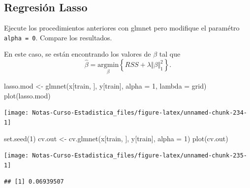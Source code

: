 \documentclass[
  12pt,
]{book}
\newenvironment{Shaded}{\begin{snugshade}}{\end{snugshade}}
\newcommand{\AttributeTok}[1]{\textcolor[rgb]{0.77,0.63,0.00}{#1}}
\newcommand{\DecValTok}[1]{\textcolor[rgb]{0.00,0.00,0.81}{#1}}
\newcommand{\FunctionTok}[1]{\textcolor[rgb]{0.00,0.00,0.00}{#1}}
\newcommand{\NormalTok}[1]{#1}
\newcommand{\OtherTok}[1]{\textcolor[rgb]{0.56,0.35,0.01}{#1}}
\newcommand{\SpecialCharTok}[1]{\textcolor[rgb]{0.00,0.00,0.00}{#1}}
\theoremstyle{definition}
\theoremstyle{definition}
\theoremstyle{definition}
\theoremstyle{definition}
\theoremstyle{remark}
\begin{document}
\hypertarget{regresiuxf3n-lasso-1}{%
\subsection{Regresión Lasso}\label{regresiuxf3n-lasso-1}}

Ejecute los procedimientos anteriores con glmnet pero modifique el paramétro \texttt{alpha\ =\ 0}. Compare los resultados.

En este caso, se están encontrando los valores de \(\beta\) tal que
\[\hat{\beta} = \underset{\beta}{\mathrm{argmin}} \left\{RSS + \lambda \Vert \beta \Vert_1^2\right\}.\]

\begin{Shaded}
\begin{Highlighting}[]
\NormalTok{lasso.mod }\OtherTok{\textless{}{-}} \FunctionTok{glmnet}\NormalTok{(x[train, ], y[train], }\AttributeTok{alpha =} \DecValTok{1}\NormalTok{,}
    \AttributeTok{lambda =}\NormalTok{ grid)}
\FunctionTok{plot}\NormalTok{(lasso.mod)}
\end{Highlighting}
\end{Shaded}

\begin{center}\texttt{[image: Notas-Curso-Estadistica\_files/figure-latex/unnamed-chunk-234-1]} \end{center}

\begin{Shaded}
\begin{Highlighting}[]
\FunctionTok{set.seed}\NormalTok{(}\DecValTok{1}\NormalTok{)}
\NormalTok{cv.out }\OtherTok{\textless{}{-}} \FunctionTok{cv.glmnet}\NormalTok{(x[train, ], y[train], }\AttributeTok{alpha =} \DecValTok{1}\NormalTok{)}
\FunctionTok{plot}\NormalTok{(cv.out)}
\end{Highlighting}
\end{Shaded}

\begin{center}\texttt{[image: Notas-Curso-Estadistica\_files/figure-latex/unnamed-chunk-235-1]} \end{center}

\begin{Shaded}
\end{Shaded}

\begin{verbatim}
## [1] 0.06939507
\end{verbatim}
\end{document}
